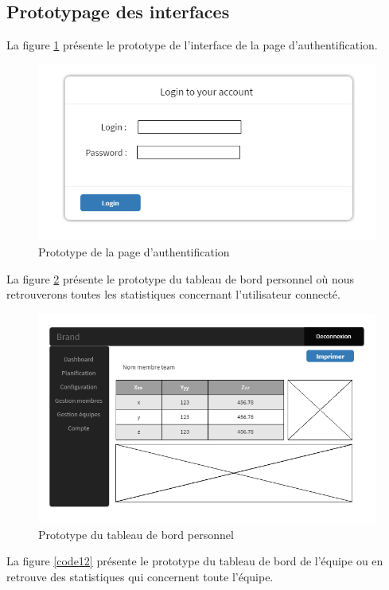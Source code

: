 \subsection{Prototypage des interfaces}
La figure \ref{code10} présente le prototype de l'interface de la page d'authentification.
\begin{figure}[H]
  \centering
  \includegraphics[scale=1]{figures/prototypes/Login_form.PNG}
  \caption{Prototype de la page d'authentification}
  \label{code10}
\end{figure}
La figure \ref{code11} présente le prototype du tableau de bord personnel où nous retrouverons toutes les statistiques concernant l'utilisateur connecté.
\begin{figure}[H]
  \centering
  \includegraphics[scale=0.74]{figures/prototypes/Member_dashboard.PNG}
  \caption{Prototype du tableau de bord personnel}
  \label{code11}
\end{figure}
La figure \ref{code12} présente le prototype du tableau de bord de l'équipe ou en retrouve des statistiques qui concernent toute l'équipe.
